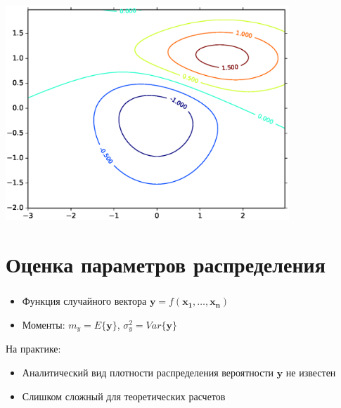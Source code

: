 \documentclass{beamer}
\begin{document}
\begin{frame}
  \frametitle{\insertsection}
  \framesubtitle{\insertsubsection}
  \includegraphics[width=0.8\textwidth]{border.eps}
\end{frame}

\section{Оценка параметров распределения}


\begin{frame}
  \frametitle{\insertsection}

  \begin{itemize}
  \item Функция случайного вектора $\mathbf{y} = f(\mathbf{x_1}, \ldots, \mathbf{x_n})$
  \item Моменты: $m_y = E\{\mathbf{y}\}$, $\sigma_y^2 = Var\{\mathbf{y}\}$
  \end{itemize} \pause
  На практике:

  \begin{itemize}
    \item Аналитический вид плотности распределения вероятности $\mathbf{y}$ не известен
    \item Слишком сложный для теоретических расчетов
  \end{itemize}

\end{frame}


\end{document}
